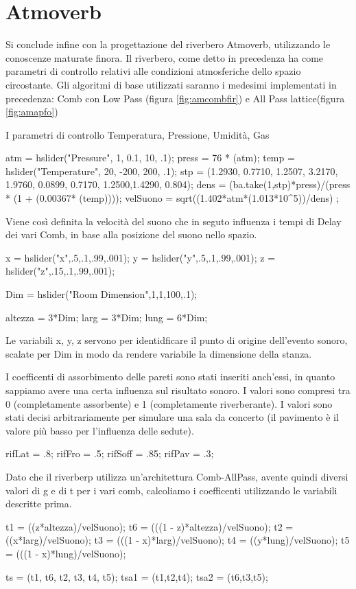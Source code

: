 \section{Atmoverb}

Si conclude infine con la progettazione del riverbero Atmoverb, utilizzando le conoscenze 
maturate finora. 
Il riverbero, come detto in precedenza ha come parametri di controllo relativi alle condizioni
atmosferiche dello spazio circostante. Gli algoritmi di base utilizzati saranno i medesimi 
implementati in precedenza: Comb con Low Pass (figura \ref{fig:amcombfir}) e All Pass lattice(figura \ref{fig:amapfo})

I parametri di controllo Temperatura, Pressione, Umidità, Gas

\begin{code}
atm = hslider("Pressure", 1, 0.1, 10, .1);
press = 76 * (atm);
temp = hslider("Temperature", 20, -200, 200, .1);
stp = (1.2930, 0.7710, 1.2507, 3.2170, 1.9760, 0.0899, 0.7170, 1.2500,1.4290, 0.804);
dens = (ba.take(1,stp)*press)/(press * (1 + (0.00367* (temp))));
velSuono = sqrt((1.402*atm*(1.013*10^5))/dens) ;
\end{code}


\bigskip 

Viene così definita la velocità del suono che in seguto influenza i tempi di Delay dei vari Comb,
in base alla posizione del suono nello spazio.

\begin{code}
x = hslider("x",.5,.1,.99,.001);
y = hslider("y",.5,.1,.99,.001);
z = hslider("z",.15,.1,.99,.001); 

Dim = hslider("Room Dimension",1,1,100,.1);

altezza = 3*Dim;
larg = 3*Dim;
lung = 6*Dim;
\end{code}

Le variabili x, y, z servono per identidficare il punto di origine dell'evento sonoro, scalate 
per Dim in modo da rendere variabile la dimensione della stanza.

I coefficenti di assorbimento delle pareti sono stati inseriti anch'essi, in quanto sappiamo
avere una certa influenza sul risultato sonoro. I valori sono compresi tra 0 
(completamente assorbente) e 1 (completamente riverberante). I valori sono stati decisi
arbitrariamente per simulare una sala da concerto (il pavimento è il valore più basso per 
l'influenza delle sedute). 

\begin{code}
rifLat = .8;
rifFro = .5;
rifSoff = .85;
rifPav = .3;
\end{code}

Dato che il riverberp utilizza un'architettura Comb-AllPass, avente quindi diversi valori di g e di t
per i vari comb, calcoliamo i coefficenti utilizzando le variabili descritte prima.

\begin{code}
t1 = ((z*altezza)/velSuono);
t6 = (((1 - z)*altezza)/velSuono);
t2 = ((x*larg)/velSuono);
t3 = (((1 - x)*larg)/velSuono);
t4 = ((y*lung)/velSuono);
t5 = (((1 - x)*lung)/velSuono);

ts = (t1, t6, t2, t3, t4, t5);
tsa1 = (t1,t2,t4);
tsa2 = (t6,t3,t5);
\end{code}